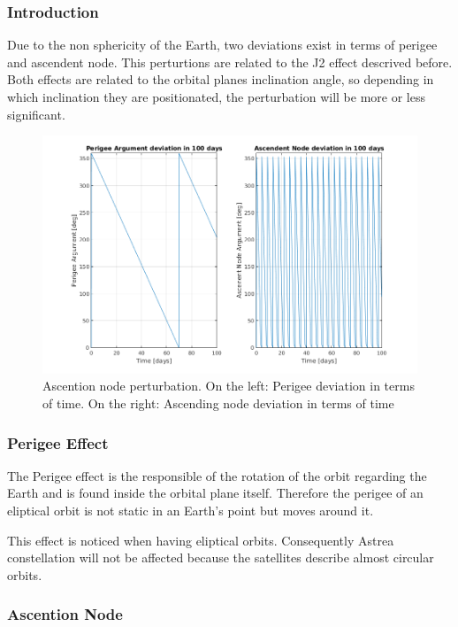 \subsubsection{Introduction}

Due to the non sphericity of the Earth, two deviations exist in terms of perigee and ascendent node. This perturtions are related to the J2 effect descrived before.
Both effects are related to the orbital planes inclination angle, so depending in which inclination they are positionated, the perturbation will be more or less  significant.

\begin{figure}[H] %
	\centering
	\includegraphics[width=.8\textwidth]{./decay/Inclination.png}
	\caption[Ascention node perturbation]{Ascention node perturbation. On the left: Perigee deviation in terms of time. On the right: Ascending node deviation in terms of time}
	\label{fig:Inclination} 
\end{figure}

\subsubsection{Perigee Effect}
The Perigee effect is the responsible of the rotation of the orbit regarding the Earth and is found inside the orbital plane itself. Therefore the perigee of an eliptical orbit is not static in an Earth's point but moves around it. 

This effect is noticed when having eliptical orbits. Consequently Astrea constellation will not be affected because the satellites describe almost circular orbits.

\subsubsection{Ascention Node}

